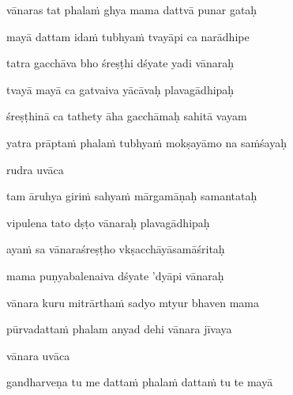 vānaras tat phalaṁ ghya mama dattvā punar gataḥ\thinspace{\dandab} \dontdisplaylinenum

mayā dattam idaṁ tubhyaṁ tvayāpi ca narādhipe \veg\dontdisplaylinenum
{}

tatra gacchāva bho śreṣṭhi dśyate yadi vānaraḥ\thinspace{\dandab} \dontdisplaylinenum

tvayā mayā ca gatvaiva yācāvaḥ plavagādhipaḥ \veg\dontdisplaylinenum
{}

śreṣṭhinā ca tathety āha gacchāmaḥ sahitā vayam\thinspace{\dandab} \dontdisplaylinenum

yatra prāptaṁ phalaṁ tubhyaṁ mokṣayāmo na saṁśayaḥ \veg\dontdisplaylinenum
{}

rudra uvāca~{\dandab}\dontdisplaylinenum 

tam āruhya giriṁ sahyaṁ mārgamāṇaḥ samantataḥ\thinspace{\danda} \dontdisplaylinenum

vipulena tato dṣṭo vānaraḥ plavagādhipaḥ \veg\dontdisplaylinenum
{}

ayaṁ sa vānaraśreṣṭho vkṣacchāyāsamāśritaḥ\thinspace{\dandab} \dontdisplaylinenum

mama puṇyabalenaiva dśyate 'dyāpi vānaraḥ \veg\dontdisplaylinenum
{}

vānara kuru mitrārthaṁ sadyo mtyur bhaven mama\thinspace{\dandab} \dontdisplaylinenum

pūrvadattaṁ phalam anyad dehi vānara jīvaya \veg\dontdisplaylinenum
{}

vānara uvāca~{\dandab}\dontdisplaylinenum 

gandharveṇa tu me dattaṁ phalaṁ dattaṁ tu te mayā\thinspace{\danda} \dontdisplaylinenum

